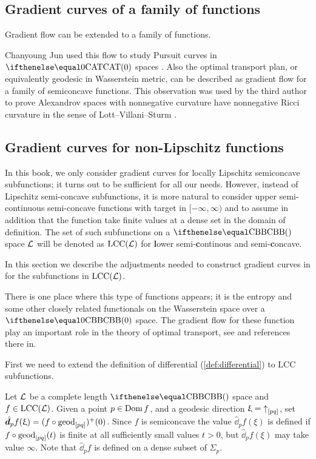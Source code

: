 \subsection*{Gradient curves of a family of functions}

Gradient flow can be extended to a family of functions.

Chanyoung Jun used this flow to study Pursuit curves in $\CAT0$ spaces \cite{jun:thesis,jun:grad}.
Also the optimal transport plan, or equivalently geodesic in Wasserstein metric, can be described as gradient flow for a family of semiconcave functions.
This observation was used by the third author to prove Alexandrov spaces with nonnegative curvature have nonnegative Ricci curvature in the sense of Lott--Villani--Sturm \cite{petrunin:optimal}.



\subsection*{Gradient curves for non-Lipschitz functions}\label{sec:non-lip}

\def\LSCSC{\mathrm{LCC}}%
\def\Wasserstein{\mathrm{P}_2}

In this book, we only consider gradient curves for locally Lipschitz semiconcave subfunctions;
it turns out to be sufficient for all our needs.
However, 
instead of Lipschitz semi-concave subfunctions,
it is more natural to consider upper semi-continuous semi-concave functions
with target in $[-\infty,\infty)$
and to assume in addition that 
the function take finite values at a dense set in the domain of definition.
The set of such subfunctions on a $\Alex{}$ space $\mathcal{L}$ will be denoted as 
$\LSCSC(\spc{L})$ for \textbf{l}ower semi-\textbf{c}ontinous and semi-\textbf{c}oncave.

In this section we describe the adjustments needed
to construct gradient curves in for the subfunctions in $\LSCSC(\spc{L})$.

There is one place where this type of functions appears;
it is the entropy and some other closely related functionals on the Wasserstein space over a  $\Alex0$ space.
The gradient flow for these function play an important role in the theory of optimal transport, see \cite{villani} and references there in. 


First we need to extend the definition of differential (\ref{def:differential}) to $\LSCSC$ subfunctions.

Let $\mathcal{L}$ be a complete length $\Alex{}$ space and $f\in\LSCSC(\spc{L})$.
Given a point $p\in \Dom f$, and a geodesic direction $\upxi={\uparrow}_{[{p}{q}]}$, 
set 
$\hat \dd_pf(\xi)=(f\circ\geod_{[pq]})^+(0)$.
Since $f$ is semiconcave the value $\hat \dd_pf(\xi)$ is defined if $f\circ\geod_{[pq]}(t)$ is finite at all sufficiently small values $t>0$,
but $\hat \dd_pf(\xi)$ may take value $\infty$. 
Note that $\hat \dd_pf$ is defined on a dense subset of $\Sigma_p$.

